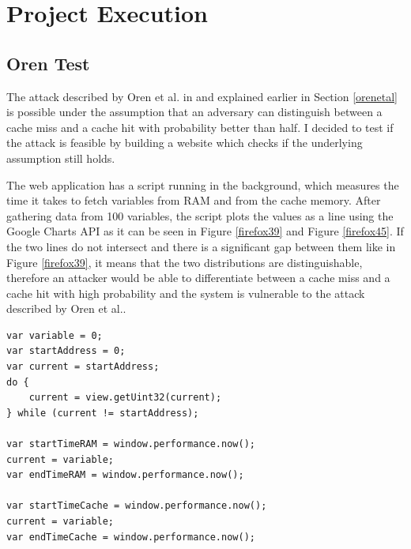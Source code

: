\documentclass[10pt,a4paper,twoside]{book}
\begin{document}

\chapter{Project Execution}
\label{chap:execution}


\section{Oren Test}

The attack described by Oren et al. in \cite{oren2015spy} and explained earlier in Section \ref{orenetal} is possible under the assumption that an adversary can distinguish between a cache miss and a cache hit with probability better than half. I decided to test if the attack is feasible by building a website which checks if the underlying assumption still holds. 

The web application has a script running in the background, which measures the time it takes to fetch variables from RAM and from the cache memory. After gathering data from 100 variables, the script plots the values as a line using the Google Charts API \cite{googlecharts} as it can be seen in Figure \ref{firefox39} and Figure \ref{firefox45}. If the two lines do not intersect and there is a significant gap between them like in Figure \ref{firefox39}, it means that the two distributions are distinguishable, therefore an attacker would be able to differentiate between a cache miss and a cache hit with high probability and the system is vulnerable to the attack described by Oren et al.\cite{oren2015spy}. 

\begin{lstlisting}[caption={Code for comparing access times from RAM vs Cache},label={orentest},  xleftmargin=0.7cm]
var variable = 0;
var startAddress = 0;
var current = startAddress;
do {
	current = view.getUint32(current);
} while (current != startAddress);

var startTimeRAM = window.performance.now();
current = variable;
var endTimeRAM = window.performance.now();

var startTimeCache = window.performance.now();
current = variable;
var endTimeCache = window.performance.now();
\end{lstlisting}
\end{document}
